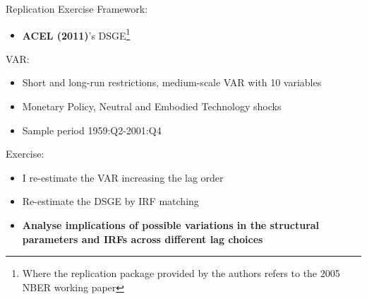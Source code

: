\documentclass[11pt]{beamer}
\begin{document}
\begin{frame}{Replication Exercise}
    Framework:
    \begin{itemize}
        \item \textbf{ACEL (2011)}'s DSGE\footnote{Where the replication package provided by the authors refers to the 2005 NBER working paper}
    \end{itemize}

    VAR:
    \begin{itemize}
        \item Short and long-run restrictions, medium-scale VAR with 10 variables
        \item Monetary Policy, Neutral and Embodied Technology shocks
        \item Sample period 1959:Q2-2001:Q4
    \end{itemize}
    
    Exercise:
    \begin{itemize}
        \item I re-estimate the VAR increasing the lag order
        \item Re-estimate the DSGE by IRF matching
        \vspace{0.2cm}

        \item \textbf{\textcolor{PadovaRed}{Analyse implications of possible variations in the structural parameters and IRFs across different lag choices}}
    \end{itemize}
\end{frame}
\end{document}
